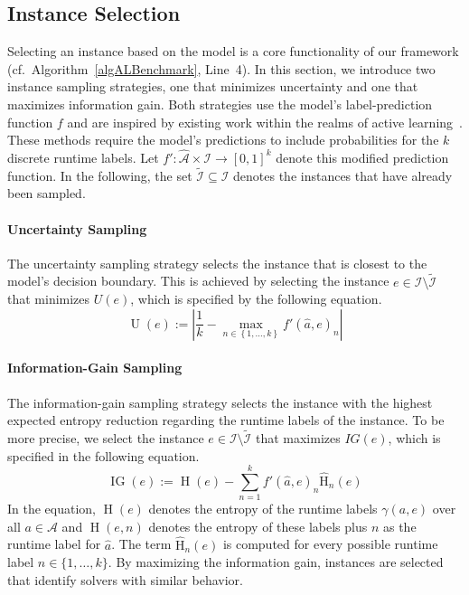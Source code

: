\documentclass[sn-basic, Numbered]{sn-jnl} %
\begin{document}
\subsection{Instance Selection}
\label{sec:main:selection}

Selecting an instance based on the model is a core functionality of our framework (cf.~Algorithm~\ref{algALBenchmark}, Line~4).
In this section, we introduce two instance sampling strategies, one that minimizes uncertainty and one that maximizes information gain.
Both strategies use the model's label-prediction function $f$ and are inspired by existing work within the realms of active learning~\cite{settles2009active}.
These methods require the model's predictions to include probabilities for the $k$ discrete runtime labels.
Let \mbox{$f' : \mathcal{\hat A} \times \mathcal{I} \rightarrow \left[0, 1\right]^k$} denote this modified prediction function.
In the following, the set $\tilde{\mathcal{I}} \subseteq \mathcal{I}$ denotes the instances that have already been sampled.

\paragraph{Uncertainty Sampling}

The uncertainty sampling strategy selects the instance that is closest to the model's decision boundary.
This is achieved by selecting the instance $e \in \mathcal{I} \setminus \tilde{\mathcal{I}}$ that minimizes $U(e)$, which is specified by the following equation.
%
\begin{equation*}
  \operatorname{U}(e) := \left\lvert \frac{1}{k} - \max_{n \in \left\lbrace 1, \dots, k \right\rbrace} f'\!\left(\hat{a}, e\right)_{n} \right\rvert
\end{equation*}

\paragraph{Information-Gain Sampling}

The information-gain sampling strategy selects the instance with the highest expected entropy reduction regarding the runtime labels of the instance.
To be more precise, we select the instance $e \in \mathcal{I} \setminus \tilde{\mathcal{I}}$ that maximizes $IG(e)$, which is specified in the following equation.
%
\begin{equation*}
  \operatorname{IG}(e) := \operatorname{H}(e) - \sum_{n = 1}^{k} f'(\hat{a}, e)_{n} \operatorname{\hat H}_n(e)
\end{equation*}
%
In the equation, $\operatorname{H}(e)$ denotes the entropy of the runtime labels $\gamma(a, e)$ over all $a \in \mathcal{A}$ and $\operatorname{H}(e, n)$ denotes the entropy of these labels plus $n$ as the runtime label for $\hat{a}$.
The term $\operatorname{\hat H}_n(e)$ is computed for every possible runtime label $n \in \{1, \dots, k\}$.
By maximizing the information gain, instances are selected that identify solvers with similar behavior.
\end{document}
